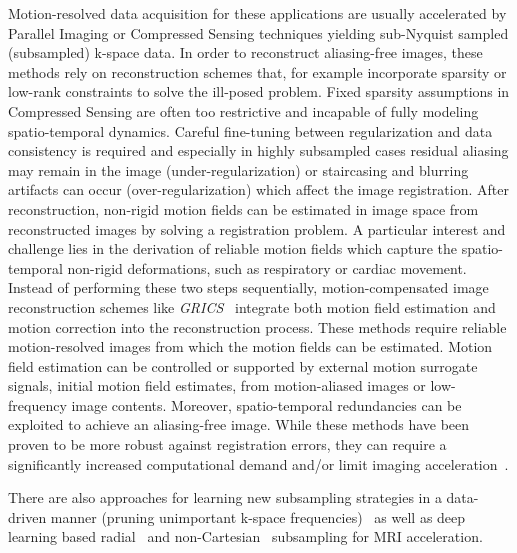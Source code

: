 \documentclass[english,version-2022-01]{uzl-thesis} %
\begin{document}
Motion-resolved data acquisition for these applications are usually accelerated by Parallel Imaging or Compressed Sensing techniques yielding sub-Nyquist sampled (subsampled) k-space data. In order to reconstruct aliasing-free images, these methods rely on reconstruction schemes that, for example incorporate sparsity or low-rank constraints to solve the ill-posed problem. Fixed sparsity assumptions in Compressed Sensing are often too restrictive and incapable of fully modeling spatio-temporal dynamics. Careful fine-tuning between regularization and data consistency is required and especially in highly subsampled cases residual aliasing may remain in the image (under-regularization) or staircasing and blurring artifacts can occur (over-regularization) which affect the image registration. After reconstruction, non-rigid motion fields can be estimated in image space from reconstructed images by solving a registration problem. A particular interest and challenge lies in the derivation of reliable motion fields which capture the spatio-temporal non-rigid deformations, such as respiratory or cardiac movement. Instead of performing these two steps sequentially, motion-compensated image reconstruction schemes like \emph{GRICS}~\cite{GRICS} integrate both motion field estimation and motion correction into the reconstruction process. These methods require reliable motion-resolved images from which the motion fields can be estimated. Motion field estimation can be controlled or supported by external motion surrogate signals, initial motion field estimates, from motion-aliased images or low-frequency image contents. Moreover, spatio-temporal redundancies can be exploited to achieve an aliasing-free image. While these methods have been proven to be more robust against registration errors, they can require a significantly increased computational demand and/or limit imaging acceleration~\cite{Kuestner2022}.

There are also approaches for learning new subsampling strategies in a data-driven manner (pruning unimportant k-space frequencies)~\cite{MRISubsamplingPruning} as well as deep learning based radial~\cite{DeepMRIReconstructionRadialSubsampling} and non-Cartesian~\cite{DeepMRIReconstructionSubsampling} subsampling for MRI acceleration.


\end{document}
